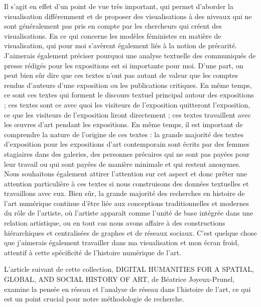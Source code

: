 \documentclass[a4paper, twoside, 12pt]{book}
\begin{document}
Il s'agit en effet d'un point de vue très important, qui permet d'aborder la visualisation différemment et de proposer des visualisations à des niveaux qui ne sont généralement pas pris en compte par les chercheurs qui créent des visualisations. En ce qui concerne les modèles féministes en matière de visualisation, qui pour moi s'avèrent également liés à la notion de précarité. J'aimerais également préciser pourquoi une analyse textuelle des communiqués de presse rédigés pour les expositions est si importante pour moi. D'une part, on peut bien sûr dire que ces textes n'ont pas autant de valeur que les comptes rendus d'auteurs d'une exposition ou les publications critiques. En même temps, ce sont ces textes qui forment le discours textuel principal autour des expositions ; ces textes sont ce avec quoi les visiteurs de l'exposition quitteront l'exposition, ce que les visiteurs de l'exposition liront directement ; ces textes travaillent avec les œuvres d'art pendant les expositions. En même temps, il est important de comprendre la nature de l'origine de ces textes : la grande majorité des textes d'exposition pour les expositions d'art contemporain sont écrits par des femmes stagiaires dans des galeries, des personnes précaires qui ne sont pas payées pour leur travail ou qui sont payées de manière minimale et qui restent anonymes. Nous souhaitons également attirer l'attention sur cet aspect et donc prêter une attention particulière à ces textes si nous construisons des données textuelles et travaillons avec eux. Bien sûr, la grande majorité des recherches en histoire de l'art numérique continue d'être liée aux conceptions traditionnelles et modernes du rôle de l'artiste, où l'artiste apparaît comme l'unité de base intégrée dans une relation artistique, ou en tout cas nous avons affaire à des constructions hiérarchiques et centralisées de graphes et de réseaux sociaux. C'est quelque chose que j'aimerais également travailler dans ma visualisation et mon écran froid, attentif à cette spécificité de l'histoire numérique de l'art.


L'article suivant de cette collection, DIGITAL HUMANITIES FOR A SPATIAL, GLOBAL, AND SOCIAL HISTORY OF ART, de Béatrice Joyeux-Prunel, examine la pensée en réseau et l'analyse de réseau dans l'histoire de l'art, ce qui est un point crucial pour notre méthodologie de recherche.
\end{document}
